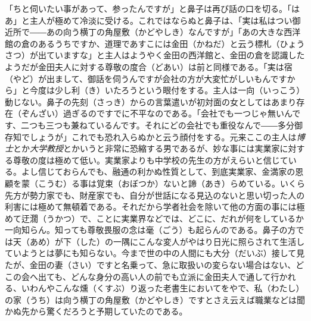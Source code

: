 \documentclass{book}
\begin{document}
「ちと伺いたい事があって、参ったんですが」と鼻子は再び話の口を切る。「はあ」と主人が極めて冷淡に受ける。これではならぬと鼻子は、「実は私はつい御近所で――あの向う横丁の角屋敷（かどやしき）なんですが」「あの大きな西洋館の倉のあるうちですか、道理であすこには金田（かねだ）と云う標札（ひょうさつ）が出ていますな」と主人はようやく金田の西洋館と、金田の倉を認識したようだが金田夫人に対する尊敬の度合（どあい）は前と同様である。「実は宿（やど）が出まして、御話を伺うんですが会社の方が大変忙がしいもんですから」と今度は少し利（き）いたろうという眼付をする。主人は一向（いっこう）動じない。鼻子の先刻（さっき）からの言葉遣いが初対面の女としてはあまり存在（ぞんざい）過ぎるのですでに不平なのである。「会社でも一つじゃ無いんです、二つも三つも兼ねているんです。それにどの会社でも重役なんで――多分御存知でしょうが」これでも恐れ入らぬかと云う顔付をする。元来ここの主人は\emph{博士}とか\emph{大学教授}とかいうと非常に恐縮する男であるが、妙な事には実業家に対する尊敬の度は極めて低い。実業家よりも中学校の先生の方がえらいと信じている。よし信じておらんでも、融通の利かぬ性質として、到底実業家、金満家の恩顧を蒙（こうむ）る事は覚束（おぼつか）ないと諦（あき）らめている。いくら先方が勢力家でも、財産家でも、自分が世話になる見込のないと思い切った人の利害には極めて無頓着である。それだから学者社会を除いて他の方面の事には極めて迂濶（うかつ）で、ことに実業界などでは、どこに、だれが何をしているか一向知らん。知っても尊敬畏服の念は毫（ごう）も起らんのである。鼻子の方では天（あめ）が下（した）の一隅にこんな変人がやはり日光に照らされて生活していようとは夢にも知らない。今まで世の中の人間にも大分（だいぶ）接して見たが、金田の妻（さい）ですと名乗って、急に取扱いの変らない場合はない、どこの会へ出ても、どんな身分の高い人の前でも立派に金田夫人で通して行かれる、いわんやこんな燻（くすぶ）り返った老書生においてをやで、私（わたし）の家（うち）は向う横丁の角屋敷（かどやしき）ですとさえ云えば職業などは聞かぬ先から驚くだろうと予期していたのである。\\
\end{document}
